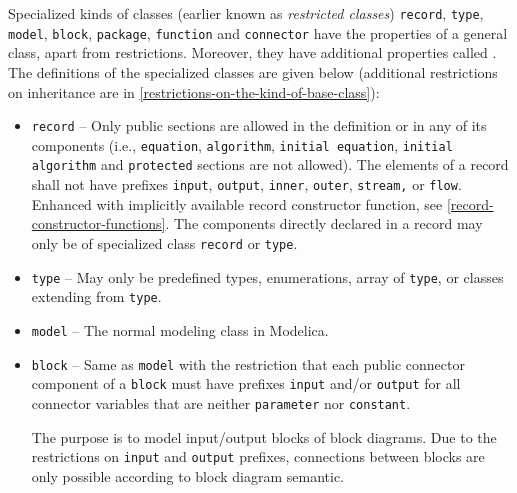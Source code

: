 Specialized kinds of classes (earlier known as \emph{restricted classes})
\lstinline!record!, \lstinline!type!, \lstinline!model!, \lstinline!block!, \lstinline!package!, \lstinline!function! and \lstinline!connector!
have the properties of a general class, apart from restrictions.
Moreover, they have additional properties called .
The definitions of the specialized classes are given below (additional restrictions on inheritance are in \cref{restrictions-on-the-kind-of-base-class}):
\begin{itemize}
\item \lstinline!record! --
Only public sections are allowed in the definition or in any of its components (i.e., \lstinline!equation!, \lstinline!algorithm!, \lstinline!initial equation!, \lstinline!initial algorithm! and \lstinline!protected! sections are not allowed).
The elements of a record shall not have prefixes \lstinline!input!, \lstinline!output!, \lstinline!inner!, \lstinline!outer!, \lstinline!stream,! or \lstinline!flow!.
Enhanced with implicitly available record constructor function, see \cref{record-constructor-functions}.
The components directly declared in a record may only be of specialized class \lstinline!record! or \lstinline!type!.

\item \lstinline!type! --
May only be predefined types, enumerations, array of \lstinline!type!, or classes extending from \lstinline!type!.

\item \lstinline!model! --
The normal modeling class in Modelica.

\item \lstinline!block! --
Same as \lstinline!model! with the restriction that each public connector component of a \lstinline!block! must have prefixes \lstinline!input! and/or \lstinline!output! for all connector variables that are neither \lstinline!parameter! nor \lstinline!constant!.

\begin{nonnormative}
The purpose is to model input/output blocks of block diagrams.
Due to the restrictions on \lstinline!input! and \lstinline!output! prefixes, connections between blocks are only possible according to block diagram semantic.
\end{nonnormative}


\end{itemize}
